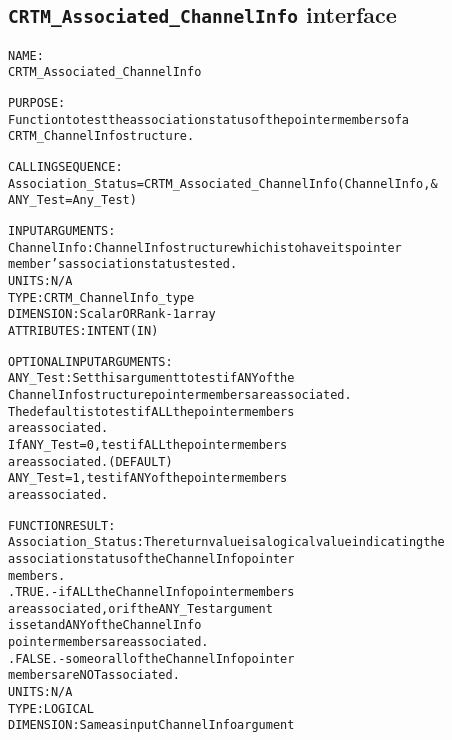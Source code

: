 \subsection{\texttt{CRTM\_Associated\_ChannelInfo} interface}
  \label{sec:CRTM_Associated_ChannelInfo_interface}
  \begin{alltt}
 
  NAME:
        CRTM_Associated_ChannelInfo
 
  PURPOSE:
        Function to test the association status of the pointer members of a
        CRTM_ChannelInfo structure.
 
  CALLING SEQUENCE:
        Association_Status = CRTM_Associated_ChannelInfo( ChannelInfo      , &
                                                          ANY_Test=Any_Test  )
 
  INPUT ARGUMENTS:
        ChannelInfo: ChannelInfo structure which is to have its pointer
                     member's association status tested.
                     UNITS:      N/A
                     TYPE:       CRTM_ChannelInfo_type
                     DIMENSION:  Scalar OR Rank-1 array
                     ATTRIBUTES: INTENT(IN)
 
  OPTIONAL INPUT ARGUMENTS:
        ANY_Test:    Set this argument to test if ANY of the
                     ChannelInfo structure pointer members are associated.
                     The default is to test if ALL the pointer members
                     are associated.
                     If ANY_Test = 0, test if ALL the pointer members
                                      are associated.  (DEFAULT)
                        ANY_Test = 1, test if ANY of the pointer members
                                      are associated.
 
  FUNCTION RESULT:
        Association_Status:  The return value is a logical value indicating the
                             association status of the ChannelInfo pointer
                             members.
                             .TRUE.  - if ALL the ChannelInfo pointer members
                                       are associated, or if the ANY_Test argument
                                       is set and ANY of the ChannelInfo
                                       pointer members are associated.
                             .FALSE. - some or all of the ChannelInfo pointer
                                       members are NOT associated.
                             UNITS:      N/A
                             TYPE:       LOGICAL
                             DIMENSION:  Same as input ChannelInfo argument
 
  \end{alltt}
